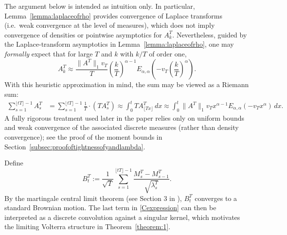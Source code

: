 \documentclass[letterpaper]{article}
\numberwithin{equation}{section}
\theoremstyle{definition}
\theoremstyle{remark}
\begin{document}
{
The argument below is intended as intuition only. In particular, Lemma~\ref{lemma:laplaceofrho} provides convergence of Laplace transforms (i.e.\ weak convergence at the level of measures), which does not imply convergence of densities or pointwise asymptotics for $A_k^T$.
Nevertheless, guided by the Laplace-transform asymptotics in Lemma~\ref{lemma:laplaceofrho}, one may \emph{formally} expect that for large $T$ and $k$ with $k/T$ of order one,
\[
  A_k^T \approx \frac{\|A^T\|_1 v_T}{T}\left(\frac{k}{T}\right)^{\alpha-1}E_{\alpha,\alpha}\!\left(-v_T\left(\frac{k}{T}\right)^\alpha\right).
\]
With this heuristic approximation in mind, the sum may be viewed as a Riemann sum:
\begin{align*}
  \sum_{s=1}^{\lfloor tT \rfloor-1}A_s^T
  &= \sum_{s=1}^{\lfloor tT\rfloor-1}\frac{1}{T}\cdot (T A_s^T)
  \approx \int_0^t T A_{\lfloor Tx\rfloor}^T\,dx
  \approx \int_0^t \|A^T\|_1 v_T x^{\alpha-1}E_{\alpha,\alpha}(-v_T x^\alpha)\,dx.
\end{align*}
A fully rigorous treatment used later in the paper relies only on uniform bounds and weak convergence of the associated discrete measures (rather than density convergence); see the proof of the moment bounds in Section~\ref{subsec:proofoftightnessofyandlambda}.
}

Define 
\[
  B_t^T:=\frac1{\sqrt{T}}\sum_{s=1}^{\lfloor tT \rfloor-1}\frac{M_s^T-M_{s-1}^T}{\sqrt{\lambda_s^T}}.
\]
By the martingale central limit theorem (see Section 3 in \cite{hall1980martingale}), $B_t^T$ converges to a standard Brownian motion. The last term in \eqref{Cexpression} can then be interpreted as a discrete convolution against a singular kernel, which motivates the limiting Volterra structure in Theorem~\ref{theorem:1}.
\end{document}
